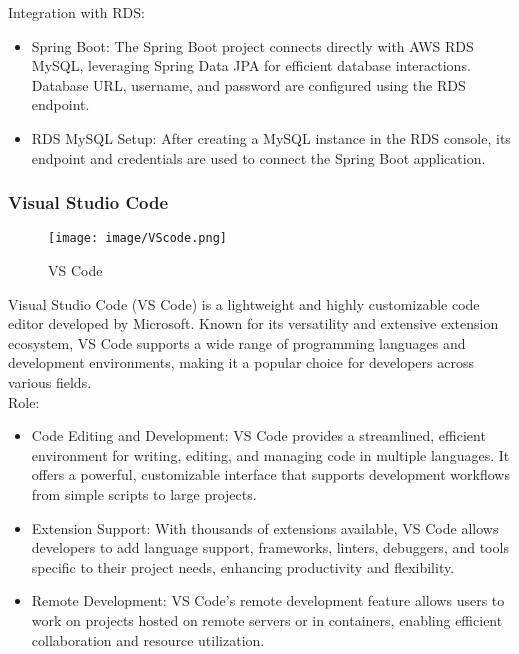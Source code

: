 \documentclass[conference]{IEEEtran}
\begin{document}
Integration with RDS:
\begin{itemize}
    \item Spring Boot: The Spring Boot project connects directly with AWS RDS MySQL, leveraging Spring Data JPA for efficient database interactions. Database URL, username, and password are configured using the RDS endpoint.\\
    \item RDS MySQL Setup: After creating a MySQL instance in the RDS console, its endpoint and credentials are used to connect the Spring Boot application.\\
\end{itemize}

\subsubsection{Visual Studio Code}

\begin{figure}[h!]
    \centering
    \texttt{[image: image/VScode.png]}
    \caption{VS Code}
    \label{fig:enter-label}
\end{figure}

\noindent Visual Studio Code (VS Code) is a lightweight and highly customizable code editor developed by Microsoft. Known for its versatility and extensive extension ecosystem, VS Code supports a wide range of programming languages and development environments, making it a popular choice for developers across various fields.\\

Role:
\begin{itemize}
    \item Code Editing and Development: VS Code provides a streamlined, efficient environment for writing, editing, and managing code in multiple languages. It offers a powerful, customizable interface that supports development workflows from simple scripts to large projects.\\
    \item Extension Support: With thousands of extensions available, VS Code allows developers to add language support, frameworks, linters, debuggers, and tools specific to their project needs, enhancing productivity and flexibility.\\
    \item Remote Development: VS Code’s remote development feature allows users to work on projects hosted on remote servers or in containers, enabling efficient collaboration and resource utilization.\\
\end{itemize}
\end{document}
